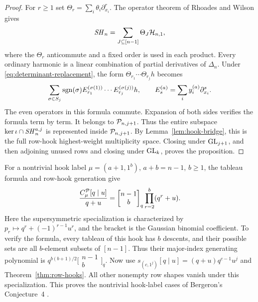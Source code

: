 \begin{proof}
For $r\geq1$ set $\Theta_r=\sum_i\theta_i\partial_{x_i}^r$.
The operator theorem of Rhoades and Wilson
\cite[Theorem~5.1]{RW} gives
\begin{equation}\label{eq:rw-operators}
 \mathit{SH}_n=\sum_{J\subseteq[n-1]}\Theta_J\mathcal H_{n,1},
\end{equation}
where the $\Theta_r$ anticommute and a fixed order is used
in each product.
Every ordinary harmonic is a linear combination of partial
derivatives of $\Delta_n$.
Under \eqref{eq:determinant-replacement}, the form
$\Theta_{r_1}\cdots\Theta_{r_j}h$ becomes
\begin{equation}\label{eq:theta-polarization}
 \sum_{\sigma\in S_j}\operatorname{sgn}(\sigma)
 E_{r_1}^{(\sigma(1))}\cdots E_{r_j}^{(\sigma(j))}h,
 \qquad
 E_s^{(a)}=\sum_i y_i^{(a)}\partial_{x_i}^s.
\end{equation}
The even operators in this formula commute.
Expansion of both sides verifies the formula term by term.
It belongs to $\mathcal P_{n,j+1}$.
Thus the entire subspace
$\ker\iota\cap\mathit{SH}_n^{a,j}$ is represented inside
$\mathcal P_{n,j+1}$.  By Lemma~\ref{lem:hook-bridge}, this
is the full row-hook highest-weight multiplicity space.
Closing under $\operatorname{GL}_{j+1}$, and then adjoining unused rows
and closing under $\operatorname{GL}_k$, proves the proposition.
\end{proof}

For a nontrivial hook label $\mu=(a+1,1^b)$, $a+b=n-1$, $b\ge1$,
the tableau formula and row-hook generation give
\begin{equation}\label{eq:hook-hook-formula}
 \frac{C_\mu^{\mathcal P}[q\mid u]}{q+u}
  =\begin{bmatrix}n-1\\b\end{bmatrix}_q
                 \prod_{r=2}^{b}(q^r+u).
\end{equation}
Here the supersymmetric specialization is characterized by
$p_r\mapsto q^r+(-1)^{r-1}u^r$, and the bracket is the Gaussian
binomial coefficient.  To verify the formula, every tableau of
this hook has $b$ descents, and their possible sets are all
$b$-element subsets of $[n-1]$.  Thus their major-index generating
polynomial is $q^{b(b+1)/2}\bigl[\begin{smallmatrix}n-1\\b\end{smallmatrix}\bigr]_q$.
Now use $s_{(c,1^j)}[q\mid u]=(q+u)q^{c-1}u^j$ and
Theorem~\ref{thm:row-hooks}.  All other nonempty row shapes vanish
under this specialization.  This proves the nontrivial hook-label
cases of Bergeron's Conjecture~4
\cite[Section~4.2, equation~(4.4)]{Bergeron}.

